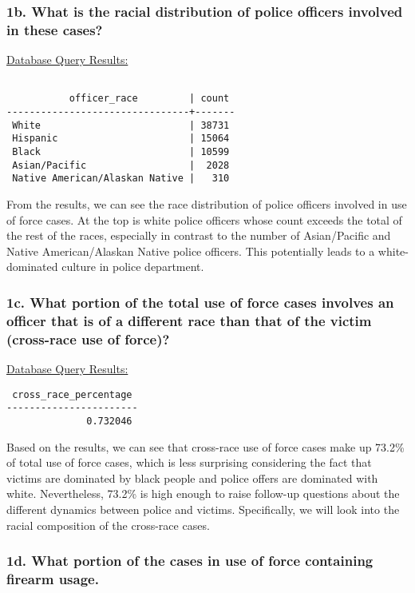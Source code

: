 \documentclass[10pt]{article}
\begin{document}
\subsubsection*{1b. What is the racial distribution of police officers involved in these cases?}

\underline{Database Query Results:}

\begin{verbatim}

           officer_race         | count
--------------------------------+-------
 White                          | 38731
 Hispanic                       | 15064
 Black                          | 10599
 Asian/Pacific                  |  2028
 Native American/Alaskan Native |   310
\end{verbatim}

From the results, we can see the race distribution of police officers involved in use of force cases. At the top is white police officers whose count exceeds the total of the rest of the races, especially in contrast to the number of Asian/Pacific and Native American/Alaskan Native police officers. This potentially leads to a white-dominated culture in police department.


\subsubsection*{1c. What portion of the total use of force cases involves an officer that is of a different race than that of the victim (cross-race use of force)?}

\underline{Database Query Results:}

\begin{verbatim}
 cross_race_percentage
-----------------------
              0.732046
\end{verbatim}

Based on the results, we can see that cross-race use of force cases make up 73.2\% of total use of force cases, which is less surprising considering the fact that victims are dominated by black people and police offers are dominated with white. Nevertheless, 73.2\% is high enough to raise follow-up questions about the different dynamics between police and victims. Specifically, we will look into the racial composition of the cross-race cases.


\subsubsection*{1d. What portion of the cases in use of force containing firearm usage.}
\end{document}
